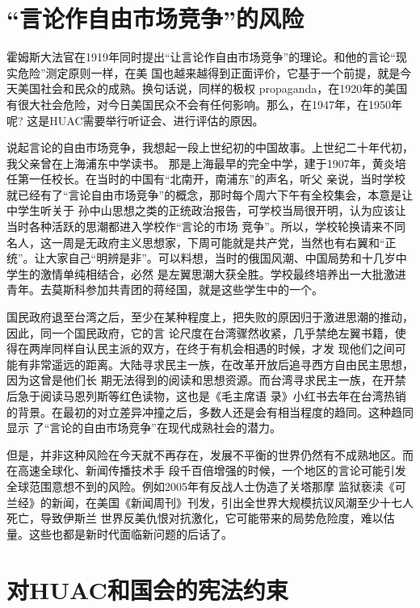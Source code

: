 \documentclass[10pt]{article}
\begin{document}
{

\pagebreak
\section{``言论作自由市场竞争''的风险}

霍姆斯大法官在1919年同时提出``让言论作自由市场竞争''的理论。和他的言论``现实危险''测定原则一样，在美
国也越来越得到正面评价，它基于一个前提，就是今天美国社会和民众的成熟。换句话说，同样的极权
propaganda，在1920年的美国有很大社会危险，对今日美国民众不会有任何影响。那么，在1947年，在1950年呢?
这是HUAC需要举行听证会、进行评估的原因。

说起言论的自由市场竞争，我想起一段上世纪初的中国故事。上世纪二十年代初，我父亲曾在上海浦东中学读书。
那是上海最早的完全中学，建于1907年，黄炎培任第一任校长。在当时的中国有``北南开，南浦东''的声名，听父
亲说，当时学校就已经有了``言论自由市场竞争''的概念，那时每个周六下午有全校集会，本意是让中学生听关于
孙中山思想之类的正统政治报告，可学校当局很开明，认为应该让当时各种活跃的思潮都进入学校作``言论的市场
竞争''。所以，学校轮换请来不同名人，这一周是无政府主义思想家，下周可能就是共产党，当然也有右翼和``正
统''。让大家自己``明辨是非''。可以料想，当时的俄国风潮、中国局势和十几岁中学生的激情单纯相结合，必然
是左翼思潮大获全胜。学校最终培养出一大批激进青年。去莫斯科参加共青团的蒋经国，就是这些学生中的一个。

国民政府退至台湾之后，至少在某种程度上，把失败的原因归于激进思潮的推动，因此，同一个国民政府，它的言
论尺度在台湾骤然收紧，几乎禁绝左翼书籍，使得在两岸同样自认民主派的双方，在终于有机会相遇的时候，才发
现他们之间可能有非常遥远的距离。大陆寻求民主一族，在改革开放后追寻西方自由民主思想，因为这曾是他们长
期无法得到的阅读和思想资源。而台湾寻求民主一族，在开禁后急于阅读马恩列斯等红色读物，这也是《毛主席语
录》小红书去年在台湾热销的背景。在最初的对立差异冲撞之后，多数人还是会有相当程度的趋同。这种趋同显示
了``言论的自由市场竞争''在现代成熟社会的潜力。

但是，并非这种风险在今天就不再存在，发展不平衡的世界仍然有不成熟地区。而在高速全球化、新闻传播技术手
段千百倍增强的时候，一个地区的言论可能引发全球范围意想不到的风险。例如2005年有反战人士伪造了关塔那摩
监狱亵渎《可兰经》的新闻，在美国《新闻周刊》刊发，引出全世界大规模抗议风潮至少十七人死亡，导致伊斯兰
世界反美仇恨对抗激化，它可能带来的局势危险度，难以估量。这些也都是新时代面临新问题的后话了。

\pagebreak
\section{对HUAC和国会的宪法约束}

}
\end{document}
